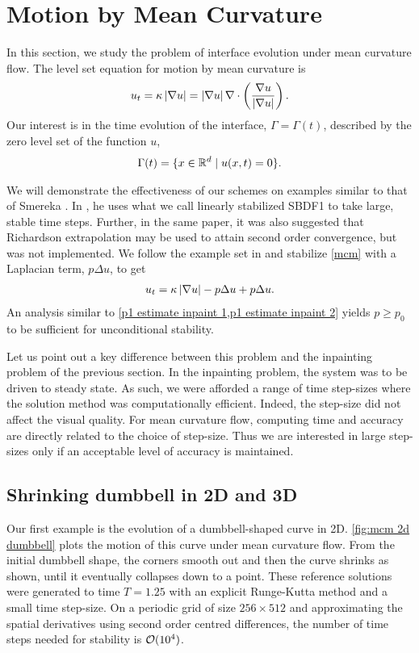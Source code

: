 \section{Motion by Mean Curvature}
In this section, we study the problem of interface evolution under mean curvature flow. The level set equation for motion by mean curvature is 
\begin{align}
        u_t 
= \kappa\left|\nabla u\right| 
= \left|\nabla u\right| \nabla \cdot \left(\frac{\nabla u}{\left|\nabla u\right|} \right).
\label{mcm}
\end{align}
Our interest is in the time evolution of the interface, $\Gamma=\Gamma(t)$, described by the zero level set of the function $u$,
\begin{align}
        \Gamma(t) = \{x \in \mathbb{R}^d \mid u(x,t) =0\}.
\end{align}

We will demonstrate the effectiveness of our schemes on examples similar to that of Smereka \cite{smereka2003semi}. In \cite{smereka2003semi}, he uses what we call linearly stabilized SBDF1 to take large, stable time steps. Further, in the same paper, it was also suggested that Richardson extrapolation may be used to attain second order convergence, but was not implemented. We follow the example set in \cite{smereka2003semi} and stabilize \cref{mcm} with a Laplacian term, $p\Delta u$, to get 
\begin{align}
        u_t = \kappa \left|\nabla u\right| - p\Delta u + p\Delta u.
\end{align}
An analysis similar to \cref{p1 estimate inpaint 1,p1 estimate inpaint 2} yields $p\geq p_0$ to be sufficient for unconditional stability.

Let us point out a key difference between this problem and the inpainting problem of the previous section. In the inpainting problem, the system was to be driven to steady state. As such, we were afforded a range of time step-sizes where the solution method was computationally efficient. Indeed, the step-size did not affect the visual quality. For mean curvature flow, computing time and accuracy are directly related to the choice of step-size. Thus we are interested in large step-sizes only if an acceptable level of accuracy is maintained.

\subsection{Shrinking dumbbell in 2D and 3D}
Our first example is the evolution of a dumbbell-shaped curve in 2D. \cref{fig:mcm 2d dumbbell} plots the motion of this curve under mean curvature flow. From the initial dumbbell shape, the corners smooth out and then the curve shrinks as shown, until it eventually collapses down to a point. These reference solutions were generated to time $T=1.25$ with an explicit Runge-Kutta method and a small time step-size. On a periodic grid of size $256\times 512$ and approximating the spatial derivatives using second order centred differences, the number of time steps needed for stability is $\mathcal{O}(10^4)$.


